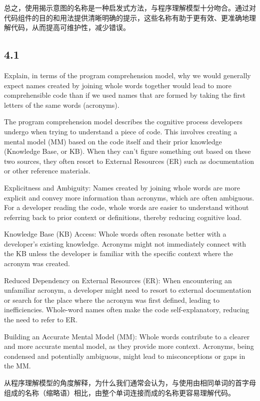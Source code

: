 总之，使用揭示意图的名称是一种启发式方法，与程序理解模型十分吻合。通过对代码组件的目的和用法提供清晰明确的提示，这些名称有助于更有效、更准确地理解代码，从而提高可维护性，减少错误。

\subsection{4.1}
Explain, in terms of the program comprehension model, why we would generally expect names created by joining whole words together would lead to more comprehensible code than if we used names that are formed by taking the first letters of the same words (acronyms).

The program comprehension model describes the cognitive process developers undergo when trying to understand a piece of code. This involves creating a mental model (MM) based on the code itself and their prior knowledge (Knowledge Base, or KB). When they can't figure something out based on these two sources, they often resort to External Resources (ER) such as documentation or other reference materials.

Explicitness and Ambiguity: Names created by joining whole words are more explicit and convey more information than acronyms, which are often ambiguous. For a developer reading the code, whole words are easier to understand without referring back to prior context or definitions, thereby reducing cognitive load.

Knowledge Base (KB) Access: Whole words often resonate better with a developer's existing knowledge. Acronyms might not immediately connect with the KB unless the developer is familiar with the specific context where the acronym was created.

Reduced Dependency on External Resources (ER): When encountering an unfamiliar acronym, a developer might need to resort to external documentation or search for the place where the acronym was first defined, leading to inefficiencies. Whole-word names often make the code self-explanatory, reducing the need to refer to ER.

Building an Accurate Mental Model (MM): Whole words contribute to a clearer and more accurate mental model, as they provide more context. Acronyms, being condensed and potentially ambiguous, might lead to misconceptions or gaps in the MM.

从程序理解模型的角度解释，为什么我们通常会认为，与使用由相同单词的首字母组成的名称（缩略语）相比，由整个单词连接而成的名称更容易理解代码。

